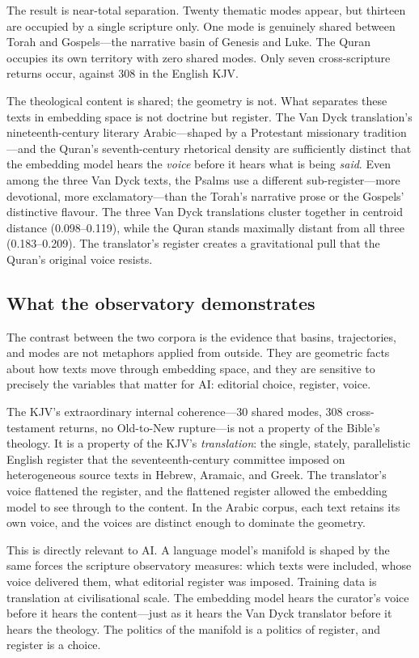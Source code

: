 The result is near-total separation. Twenty thematic modes appear, but thirteen are occupied by a single scripture only. One mode is genuinely shared between Torah and Gospels---the narrative basin of Genesis and Luke. The Quran occupies its own territory with zero shared modes. Only seven cross-scripture returns occur, against 308 in the English KJV.

The theological content is shared; the geometry is not. What separates these texts in embedding space is not doctrine but register. The Van Dyck translation's nineteenth-century literary Arabic---shaped by a Protestant missionary tradition---and the Quran's seventh-century rhetorical density are sufficiently distinct that the embedding model hears the \textit{voice} before it hears what is being \textit{said}. Even among the three Van Dyck texts, the Psalms use a different sub-register---more devotional, more exclamatory---than the Torah's narrative prose or the Gospels' distinctive flavour. The three Van Dyck translations cluster together in centroid distance (0.098--0.119), while the Quran stands maximally distant from all three (0.183--0.209). The translator's register creates a gravitational pull that the Quran's original voice resists.

\subsection{What the observatory demonstrates}

The contrast between the two corpora is the evidence that basins, trajectories, and modes are not metaphors applied from outside. They are geometric facts about how texts move through embedding space, and they are sensitive to precisely the variables that matter for AI: editorial choice, register, voice.

The KJV's extraordinary internal coherence---30 shared modes, 308 cross-testament returns, no Old-to-New rupture---is not a property of the Bible's theology. It is a property of the KJV's \emph{translation}: the single, stately, parallelistic English register that the seventeenth-century committee imposed on heterogeneous source texts in Hebrew, Aramaic, and Greek. The translator's voice flattened the register, and the flattened register allowed the embedding model to see through to the content. In the Arabic corpus, each text retains its own voice, and the voices are distinct enough to dominate the geometry.

This is directly relevant to AI. A language model's manifold is shaped by the same forces the scripture observatory measures: which texts were included, whose voice delivered them, what editorial register was imposed. Training data is translation at civilisational scale. The embedding model hears the curator's voice before it hears the content---just as it hears the Van Dyck translator before it hears the theology. The politics of the manifold is a politics of register, and register is a choice.


